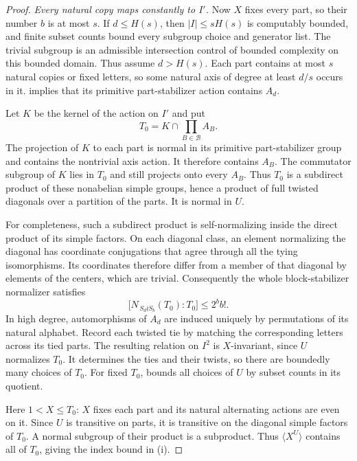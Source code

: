 \begin{proof}
\emph{Every natural copy maps constantly to $I'$.}
Now $X$ fixes every part, so their number $b$ is at most $s$.
If $d\le H(s)$, then $|I|\le sH(s)$ is computably bounded, and
finite subset counts bound every subgroup choice and generator
list.  The trivial subgroup is an admissible intersection control
of bounded complexity on this bounded domain.  Thus assume $d>H(s)$.
Each part contains at most $s$ natural copies or fixed letters,
so some natural axis of degree at least $d/s$ occurs in it.
 implies that its primitive part-stabilizer
action contains $A_d$.

Let $K$ be the kernel of the action on $I'$ and put
\[
 T_0=K\cap\prod_{B\in\mathcal B}A_B.
\]
The projection of $K$ to each part is normal in its primitive
part-stabilizer group and contains the nontrivial axis action.
It therefore contains $A_B$.  The commutator subgroup of $K$ lies
in $T_0$ and still projects onto every $A_B$.  Thus $T_0$ is a
subdirect product of these nonabelian simple groups, hence a
product of full twisted diagonals over a partition of the parts.
It is normal in $U$.

For completeness, such a subdirect product is self-normalizing
inside the direct product of its simple factors.  On each diagonal
class, an element normalizing the diagonal has coordinate
conjugations that agree through all the tying isomorphisms.  Its
coordinates therefore differ from a member of that diagonal by
elements of the centers, which are trivial.  Consequently the
whole block-stabilizer normalizer satisfies
\begin{equation}\label{n:rank-one-normalizer}
 \bigl[N_{\,S_d\wr S_b}(T_0):T_0\bigr]\le2^b b!.
\end{equation}
In high degree, automorphisms of $A_d$ are induced uniquely by
permutations of its natural alphabet.  Record each twisted tie
by matching the corresponding letters across its tied parts.
The resulting relation on $I^2$ is $X$-invariant, since $U$
normalizes $T_0$.  It determines the ties and their twists, so
there are boundedly many choices of $T_0$.  For fixed $T_0$,
 bounds all choices of $U$ by subset
counts in its quotient.

Here $1<X\le T_0$: $X$ fixes each part and its natural alternating
actions are even on it.  Since $U$ is transitive on parts, it is
transitive on the diagonal simple factors of $T_0$.  A normal
subgroup of their product is a subproduct.  Thus
$\langle X^U\rangle$ contains all of $T_0$, giving the index
bound in (i).


\end{proof}
